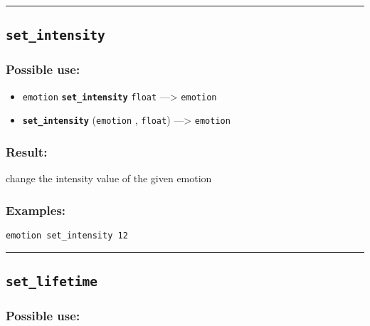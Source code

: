 \documentclass[]{book}
\providecommand{\tightlist}{%
  \setlength{\itemsep}{0pt}\setlength{\parskip}{0pt}}
\theoremstyle{definition}
\theoremstyle{definition}
\theoremstyle{definition}
\theoremstyle{remark}
\begin{document}
\begin{center}\rule{0.5\linewidth}{\linethickness}\end{center}

\subsection{\texorpdfstring{\texttt{set\_intensity}}{set\_intensity}}\label{set_intensity}

\subsubsection{Possible use:}\label{possible-use-460}

\begin{itemize}
\tightlist
\item
  \texttt{emotion} \textbf{\texttt{set\_intensity}} \texttt{float}
  ---\textgreater{} \texttt{emotion}
\item
  \textbf{\texttt{set\_intensity}} (\texttt{emotion} , \texttt{float})
  ---\textgreater{} \texttt{emotion}
\end{itemize}

\subsubsection{Result:}\label{result-444}

change the intensity value of the given emotion

\subsubsection{Examples:}\label{examples-317}

\begin{verbatim}
emotion set_intensity 12 
\end{verbatim}

\begin{center}\rule{0.5\linewidth}{\linethickness}\end{center}

\subsection{\texorpdfstring{\texttt{set\_lifetime}}{set\_lifetime}}\label{set_lifetime}

\subsubsection{Possible use:}\label{possible-use-461}
\end{document}
